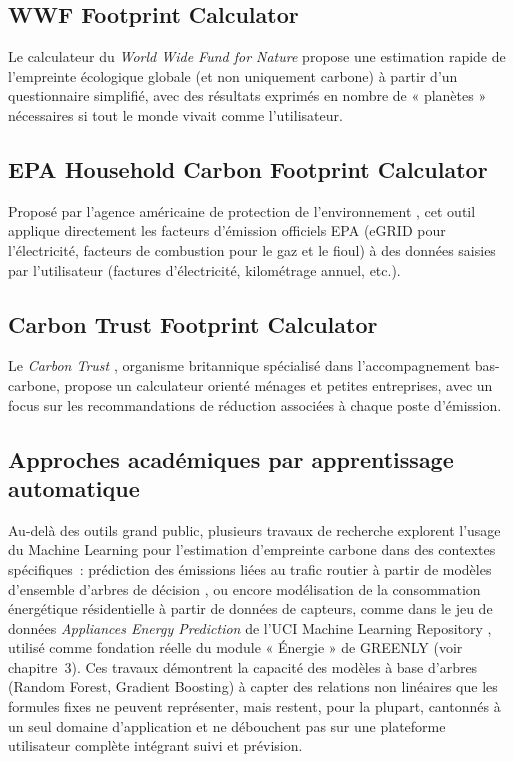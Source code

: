\subsection{WWF Footprint Calculator}
Le calculateur du \textit{World Wide Fund for Nature} \cite{wwfFootprint} propose une estimation rapide de l'empreinte écologique globale (et non uniquement carbone) à partir d'un questionnaire simplifié, avec des résultats exprimés en nombre de « planètes » nécessaires si tout le monde vivait comme l'utilisateur.

\subsection{EPA Household Carbon Footprint Calculator}
Proposé par l'agence américaine de protection de l'environnement \cite{epaCalculator}, cet outil applique directement les facteurs d'émission officiels EPA (eGRID pour l'électricité, facteurs de combustion pour le gaz et le fioul) à des données saisies par l'utilisateur (factures d'électricité, kilométrage annuel, etc.).

\subsection{Carbon Trust Footprint Calculator}
Le \textit{Carbon Trust} \cite{carbonTrust}, organisme britannique spécialisé dans l'accompagnement bas-carbone, propose un calculateur orienté ménages et petites entreprises, avec un focus sur les recommandations de réduction associées à chaque poste d'émission.

\subsection{Approches académiques par apprentissage automatique}
Au-delà des outils grand public, plusieurs travaux de recherche explorent l'usage du Machine Learning pour l'estimation d'empreinte carbone dans des contextes spécifiques~: prédiction des émissions liées au trafic routier à partir de modèles d'ensemble d'arbres de décision \cite{scikitlearn}, ou encore modélisation de la consommation énergétique résidentielle à partir de données de capteurs, comme dans le jeu de données \textit{Appliances Energy Prediction} de l'UCI Machine Learning Repository \cite{candanedo2017}, utilisé comme fondation réelle du module « Énergie » de GREENLY (voir chapitre~3). Ces travaux démontrent la capacité des modèles à base d'arbres (Random Forest, Gradient Boosting) à capter des relations non linéaires que les formules fixes ne peuvent représenter, mais restent, pour la plupart, cantonnés à un seul domaine d'application et ne débouchent pas sur une plateforme utilisateur complète intégrant suivi et prévision.

